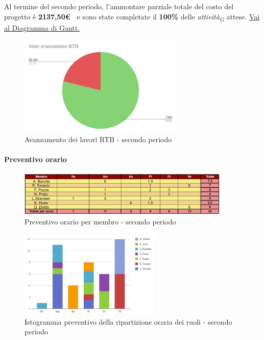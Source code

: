 Al termine del secondo periodo, l'ammontare parziale totale del costo del progetto è \textbf{ 2137,50\euro\ } e sono state completate il \textbf{100\%} delle \textit{attività}\textsubscript{\textit{G}} attese.
\href{https://github.com/orgs/ByteOps-swe/projects/3/views/1?sortedBy%5Bdirection%5D=asc&sortedBy%5BcolumnId%5D=64182560}{Vai al Diagramma di Gantt.}


\begin{figure}[H]
    \centering
    \begin{minipage}[b]{0.70\textwidth}
        \centering
        \includegraphics[width=0.7\textwidth]{../Images/avanzamento2Periodo.png}
        \caption{Avanzamento dei lavori RTB - secondo periodo}
        \label{fig:Avanzamento_RTB_2}
    \end{minipage}
\end{figure}



\paragraph{Preventivo orario} \hspace{1pt}

\begin{figure}[H]
    \centering
    \includegraphics[width=0.9\textwidth]{../Images/preventivoOrario2Periodo.png}
    \caption{Preventivo orario per membro - secondo periodo}
    \label{fig:Preventivo_orario_2}
\end{figure}

\begin{figure}[H]
    \centering
    \includegraphics[width=0.6\textwidth]{../Images/preventivoDivisioneRuoli2Periodo.png}
    \caption{Istogramma preventivo della ripartizione oraria dei ruoli - secondo periodo}
    \label{fig:Preventivo_ripartizione_oraria_2}
\end{figure}

